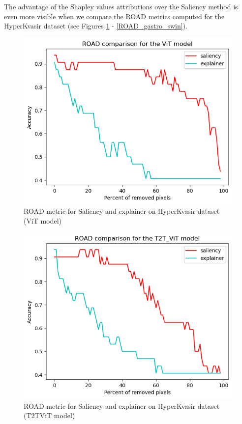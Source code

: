 \documentclass[magisterska,en]{pracamgr}
\begin{document}
The advantage of the Shapley values attributions over the Saliency method is even more visible when we compare the ROAD metrics computed for the HyperKvasir dataset (see Figures \ref{ROAD_gastro_vit} - \ref{ROAD_gastro_swin}).


\begin{figure}[H]
\centering
\includegraphics[scale=0.5]{./images/ROAD_gastro_vit.png}
\caption{ROAD metric for Saliency and explainer on HyperKvasir dataset (ViT model)}
\label{ROAD_gastro_vit}
\end{figure}


\begin{figure}[H]
\centering
\includegraphics[scale=0.5]{./images/ROAD_gastro_t2t_vit.png}
\caption{ROAD metric for Saliency and explainer on HyperKvasir dataset (T2T\textunderscore ViT model)}
\label{ROAD_gastro_t2t_vit}
\end{figure}
\end{document}
